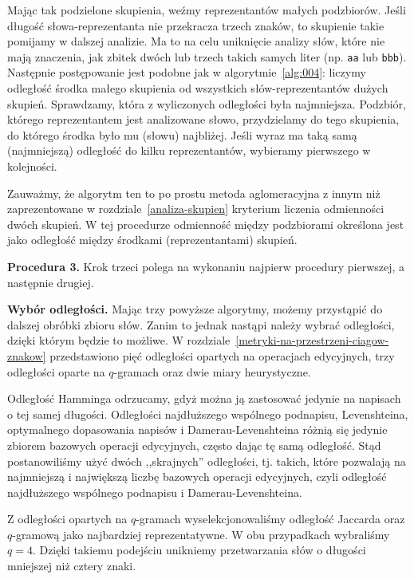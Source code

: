 \documentclass{praca1}
\begin{document}
Mając tak podzielone skupienia, weźmy reprezentantów małych podzbiorów. Jeśli długość słowa-reprezentanta nie przekracza trzech znaków, to skupienie takie pomijamy w dalszej analizie. Ma to na celu uniknięcie analizy słów, które nie mają znaczenia, jak zbitek dwóch lub trzech takich samych liter (np. \verb|aa| lub \verb|bbb|). Następnie postępowanie jest podobne jak w algorytmie~\ref{alg:004}: liczymy odległość środka małego skupienia od wszystkich słów-reprezentantów dużych skupień. Sprawdzamy, która z wyliczonych odległości była najmniejsza. Podzbiór, którego reprezentantem jest analizowane słowo, przydzielamy do tego skupienia, do którego środka było mu (słowu) najbliżej. Jeśli wyraz ma taką samą (najmniejszą) odległość do kilku reprezentantów, wybieramy pierwszego w kolejności.

Zauważmy, że algorytm ten to po prostu metoda aglomeracyjna z innym niż zaprezentowane w rozdziale~\ref{analiza-skupien} kryterium liczenia odmienności dwóch skupień. W tej procedurze odmienność między podzbiorami określona jest jako odległość między środkami (reprezentantami) skupień.



\textbf{Procedura 3.} Krok trzeci polega na wykonaniu najpierw procedury pierwszej, a następnie drugiej.

\textbf{Wybór odległości.} Mając trzy powyższe algorytmy, możemy przystąpić do dalszej obróbki zbioru słów. Zanim to jednak nastąpi należy wybrać odległości, dzięki którym będzie to możliwe. W rozdziale~\ref{metryki-na-przestrzeni-ciagow-znakow} przedstawiono pięć odległości opartych na operacjach edycyjnych, trzy odległości oparte na $q$-gramach oraz dwie miary heurystyczne. 

Odległość Hamminga odrzucamy, gdyż można ją zastosować jedynie na napisach o tej samej długości. Odległości najdłuższego wspólnego podnapisu, Levenshteina, optymalnego dopasowania napisów i Damerau-Levenshteina różnią się jedynie zbiorem bazowych operacji edycyjnych, często dając tę samą odległość. Stąd postanowiliśmy użyć dwóch ,,skrajnych'' odległości, tj. takich, które pozwalają na najmniejszą i największą liczbę bazowych operacji edycyjnych, czyli odległość najdłuższego wspólnego podnapisu i Damerau-Levenshteina. 

Z odległości opartych na $q$-gramach wyselekcjonowaliśmy odległość Jaccarda oraz $q$-gramową jako najbardziej reprezentatywne. W obu przypadkach wybraliśmy $q=4$. Dzięki takiemu podejściu unikniemy przetwarzania słów o długości mniejszej niż cztery znaki.
\end{document}
